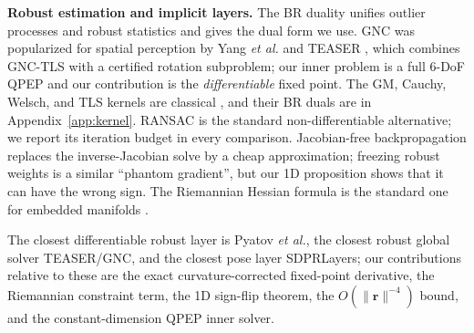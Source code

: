 \noindent\textbf{Robust estimation and implicit layers.} The BR duality \cite{black1996br} unifies
outlier processes and robust statistics and gives the dual form we use. GNC was popularized for
spatial perception by Yang \emph{et al.} \cite{yang2020gnc} and TEASER \cite{yang2020teaser}, which
combines GNC-TLS with a certified rotation subproblem; our inner problem is a full 6-DoF QPEP and
our contribution is the \emph{differentiable} fixed point. The GM, Cauchy, Welsch, and TLS kernels
are classical \cite{geman1985}, and their BR duals are in Appendix~\ref{app:kernel}. RANSAC
\cite{fischler1981ransac} is the standard non-differentiable alternative; we report its iteration
budget in every comparison. Jacobian-free backpropagation \cite{fung2022jfb} replaces the
inverse-Jacobian solve by a cheap approximation; freezing robust weights is a similar ``phantom
gradient'', but our 1D proposition shows that it can have the wrong sign. The Riemannian Hessian
formula is the standard one for embedded manifolds \cite{absil2008}.

The closest differentiable robust layer is Pyatov \emph{et al.}, the closest robust global solver
TEASER/GNC, and the closest pose layer SDPRLayers; our contributions relative to these are the exact
curvature-corrected fixed-point derivative, the Riemannian constraint term, the 1D sign-flip theorem,
the $O(\|\mathbf{r}\|^{-4})$ bound, and the constant-dimension QPEP inner solver.
